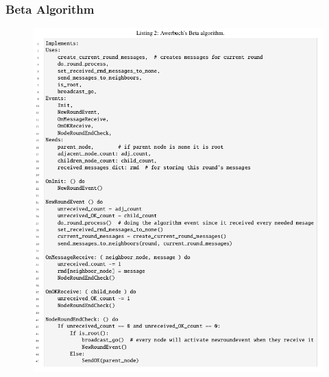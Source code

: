 \documentclass[11pt]{beamer}              %
\begin{document}
\begin{frame}
	\frametitle{Beta Algorithm}
	
	\begin{center}
		\begin{figure}
			\centering
			\includegraphics[scale=0.2]{figures/beta.png}
			\caption{}
			\label{fig:awesome_image}
		\end{figure}
	\end{center}
	
\end{frame}
\end{document}
